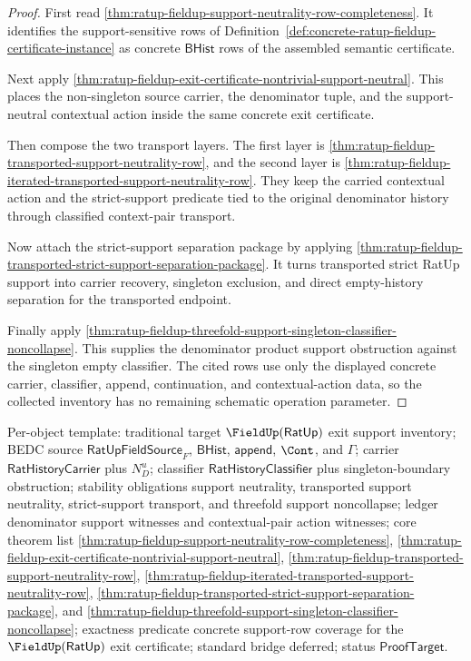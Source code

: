 \begin{proof}
First read
\autoref{thm:ratup-fieldup-support-neutrality-row-completeness}. It identifies
the support-sensitive rows of
Definition~\ref{def:concrete-ratup-fieldup-certificate-instance} as concrete
$\mathsf{BHist}$ rows of the assembled semantic certificate.

Next apply
\autoref{thm:ratup-fieldup-exit-certificate-nontrivial-support-neutral}. This
places the non-singleton source carrier, the denominator tuple, and the
support-neutral contextual action inside the same concrete exit certificate.

Then compose the two transport layers. The first layer is
\autoref{thm:ratup-fieldup-transported-support-neutrality-row}, and the second
layer is
\autoref{thm:ratup-fieldup-iterated-transported-support-neutrality-row}. They
keep the carried contextual action and the strict-support predicate tied to the
original denominator history through classified context-pair transport.

Now attach the strict-support separation package by applying
\autoref{thm:ratup-fieldup-transported-strict-support-separation-package}. It
turns transported strict RatUp support into carrier recovery, singleton
exclusion, and direct empty-history separation for the transported endpoint.

Finally apply
\autoref{thm:ratup-fieldup-threefold-support-singleton-classifier-noncollapse}.
This supplies the denominator product support obstruction against the singleton
empty classifier. The cited rows use only the displayed concrete carrier,
classifier, append, continuation, and contextual-action data, so the collected
inventory has no remaining schematic operation parameter.
\end{proof}

Per-object template: traditional target $\FieldUp(\mathsf{RatUp})$ exit support
inventory; BEDC source $\mathsf{RatUpFieldSource}_F$, $\mathsf{BHist}$,
$\mathsf{append}$, $\Cont$, and $\Gamma$; carrier
$\mathsf{RatHistoryCarrier}$ plus $N_D^u$; classifier
$\mathsf{RatHistoryClassifier}$ plus singleton-boundary obstruction; stability
obligations support neutrality, transported support neutrality,
strict-support transport, and threefold support noncollapse; ledger
denominator support witnesses and contextual-pair action witnesses; core
theorem list
\autoref{thm:ratup-fieldup-support-neutrality-row-completeness},
\autoref{thm:ratup-fieldup-exit-certificate-nontrivial-support-neutral},
\autoref{thm:ratup-fieldup-transported-support-neutrality-row},
\autoref{thm:ratup-fieldup-iterated-transported-support-neutrality-row},
\autoref{thm:ratup-fieldup-transported-strict-support-separation-package}, and
\autoref{thm:ratup-fieldup-threefold-support-singleton-classifier-noncollapse};
exactness predicate concrete support-row coverage for the
$\FieldUp(\mathsf{RatUp})$ exit certificate; standard bridge deferred; status
$\mathsf{ProofTarget}$.
